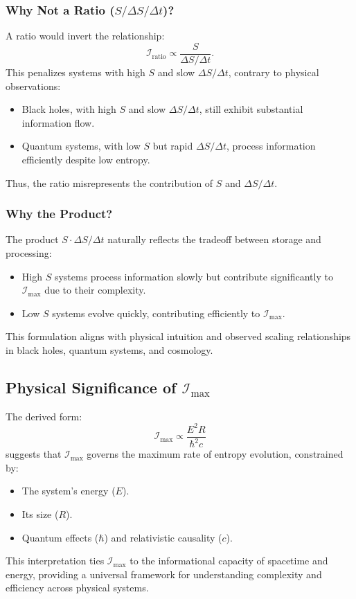 \documentclass[12pt]{article}
\begin{document}
\subsubsection{Why Not a Ratio (\( S / \Delta S / \Delta t \))?}
A ratio would invert the relationship:
\[
\mathcal{I}_{\text{ratio}} \propto \frac{S}{\Delta S / \Delta t}.
\]
This penalizes systems with high \( S \) and slow \( \Delta S / \Delta t \), contrary to physical observations:
\begin{itemize}
    \item Black holes, with high \( S \) and slow \( \Delta S / \Delta t \), still exhibit substantial information flow.
    \item Quantum systems, with low \( S \) but rapid \( \Delta S / \Delta t \), process information efficiently despite low entropy.
\end{itemize}
Thus, the ratio misrepresents the contribution of \( S \) and \( \Delta S / \Delta t \).

\subsubsection{Why the Product?}
The product \( S \cdot \Delta S / \Delta t \) naturally reflects the tradeoff between storage and processing:
\begin{itemize}
    \item High \( S \) systems process information slowly but contribute significantly to \( \mathcal{I}_{\text{max}} \) due to their complexity.
    \item Low \( S \) systems evolve quickly, contributing efficiently to \( \mathcal{I}_{\text{max}} \).
\end{itemize}
This formulation aligns with physical intuition and observed scaling relationships in black holes, quantum systems, and cosmology.

\subsection{Physical Significance of \( \mathcal{I}_{\text{max}} \)}
The derived form:
\[
\mathcal{I}_{\text{max}} \propto \frac{E^2 R}{\hbar^2 c}
\]
suggests that \( \mathcal{I}_{\text{max}} \) governs the maximum rate of entropy evolution, constrained by:
\begin{itemize}
    \item The system’s energy (\( E \)).
    \item Its size (\( R \)).
    \item Quantum effects (\( \hbar \)) and relativistic causality (\( c \)).
\end{itemize}
This interpretation ties \( \mathcal{I}_{\text{max}} \) to the informational capacity of spacetime and energy, providing a universal framework for understanding complexity and efficiency across physical systems.
\end{document}
